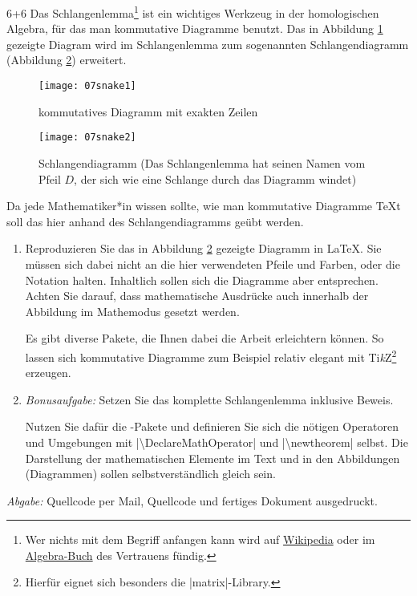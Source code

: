 \documentclass{scrartcl}
\newcommand{\abgabe}[1]{\par\noindent\textit{Abgabe:} #1}
\newcommand{\TikZ}{Ti\textit{k}Z\xspace}
\begin{document}
\begin{question}[subtitle=Schlangenlemma (Aufgabe für Mathematiker*innen)]{6+6}
Das Schlangenlemma\footnote{Wer nichts mit dem Begriff anfangen kann wird auf \href{https://de.wikipedia.org/wiki/Schlangenlemma}{Wikipedia} oder im \href{https://books.google.com/books?id=Fge-BwqhqIYC&pg=PA157}{Algebra-Buch} des Vertrauens fündig.} ist ein wichtiges Werkzeug in der homologischen Algebra, für das man kommutative Diagramme benutzt. Das in Abbildung \ref{fig:snake1} gezeigte Diagram wird im Schlangenlemma zum sogenannten Schlangendiagramm (Abbildung \ref{fig:snake2}) erweitert.

\begin{figure}[h]
	\centering
	\texttt{[image: 07snake1]}
  \caption{kommutatives Diagramm mit exakten Zeilen}
  \label{fig:snake1}
\end{figure}

\begin{figure}[h]
	\centering
	\texttt{[image: 07snake2]}
	\caption{Schlangendiagramm (Das Schlangenlemma hat seinen Namen vom Pfeil $D$, der sich wie eine Schlange durch das Diagramm windet)}
	\label{fig:snake2}
\end{figure}

\noindent Da jede Mathematiker*in wissen sollte, wie man kommutative Diagramme \TeX t soll das hier anhand des Schlangendiagramms geübt werden.
	\begin{enumerate}[label=\alph*)]
		\item Reproduzieren Sie das in Abbildung \ref{fig:snake2} gezeigte Diagramm in \LaTeX. Sie müssen sich dabei nicht an die hier verwendeten Pfeile und Farben, oder die Notation halten. Inhaltlich sollen sich die Diagramme aber entsprechen. Achten Sie darauf, dass mathematische Ausdrücke auch innerhalb der Abbildung im Mathemodus gesetzt werden.
		
		 Es gibt diverse Pakete, die Ihnen dabei die Arbeit erleichtern können. So lassen sich kommutative Diagramme zum Beispiel relativ elegant mit \TikZ\footnote{Hierfür eignet sich besonders die |matrix|-Library.} erzeugen.
		\item \emph{Bonusaufgabe:} Setzen Sie das komplette Schlangenlemma inklusive Beweis. %
		
		Nutzen Sie dafür die -Pakete und definieren Sie sich die nötigen Operatoren und Umgebungen mit |\textbackslash DeclareMathOperator| und |\textbackslash newtheorem| selbst. Die Darstellung der mathematischen Elemente im Text und in den Abbildungen (Diagrammen) sollen selbstverständlich gleich sein. 
	\end{enumerate}
	\abgabe{Quellcode per Mail{,} Quellcode und fertiges Dokument ausgedruckt.}
\end{question}
\end{document}
